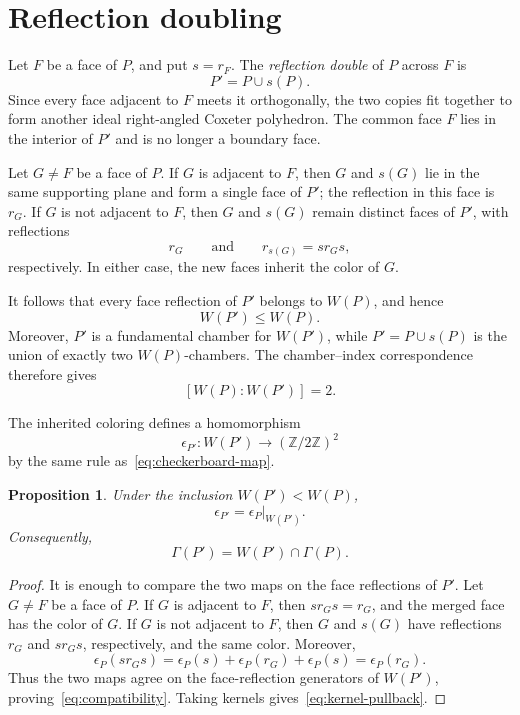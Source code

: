 \documentclass[11pt,a4paper]{amsart}
\newcommand{\ZZ}{\mathbb Z}
\theoremstyle{plain}
\newtheorem{proposition}[theorem]{Proposition}
\theoremstyle{remark}
\begin{document}
\section{Reflection doubling}\label{sec:doubling}
Let \(F\) be a face of \(P\), and put \(s=r_F\).  The
\emph{reflection double} of \(P\) across \(F\) is
\begin{equation}\label{eq:reflection-double}
  P'=P\cup s(P).
\end{equation}
Since every face adjacent to \(F\) meets it orthogonally, the two
copies fit together to form another ideal right-angled Coxeter
polyhedron.  The common face \(F\) lies in the interior of \(P'\)
and is no longer a boundary face.

Let \(G\neq F\) be a face of \(P\).  If \(G\) is adjacent to \(F\),
then \(G\) and \(s(G)\) lie in the same supporting plane and form
a single face of \(P'\); the reflection in this face is \(r_G\).
If \(G\) is not adjacent to \(F\), then \(G\) and \(s(G)\) remain
distinct faces of \(P'\), with reflections
\[
  r_G
  \qquad\text{and}\qquad
  r_{s(G)}=s r_G s,
\]
respectively.  In either case, the new faces inherit the color of
\(G\).

It follows that every face reflection of \(P'\) belongs to
\(W(P)\), and hence
\[
  W(P')\leq W(P).
\]
Moreover, \(P'\) is a fundamental chamber for \(W(P')\), while
\(P'=P\cup s(P)\) is the union of exactly two \(W(P)\)-chambers.
The chamber--index correspondence therefore gives
\begin{equation}\label{eq:W-index-two}
  [W(P):W(P')]=2.
\end{equation}

The inherited coloring defines a homomorphism
\[
  \epsilon_{P'}:W(P')\longrightarrow(\ZZ/2\ZZ)^2
\]
by the same rule as~\eqref{eq:checkerboard-map}.

\begin{proposition}\label{prop:compatibility}
Under the inclusion $W(P')<W(P)$,
\begin{equation}\label{eq:compatibility}
  \epsilon_{P'}=\left.\epsilon_P\right|_{W(P')}.
\end{equation}
Consequently,
\begin{equation}\label{eq:kernel-pullback}
  \Gamma(P')=W(P')\cap\Gamma(P).
\end{equation}
\end{proposition}

\begin{proof}
It is enough to compare the two maps on the face reflections of $P'$.  Let $G\neq F$ be a face of $P$.  If $G$ is adjacent to $F$, then $sr_Gs=r_G$, and the merged face has the color of $G$.  If $G$ is not adjacent to $F$, then $G$ and $s(G)$ have reflections $r_G$ and $sr_Gs$, respectively, and the same color.  Moreover,
\[
  \epsilon_P(sr_Gs)
  =\epsilon_P(s)+\epsilon_P(r_G)+\epsilon_P(s)
  =\epsilon_P(r_G).
\]
Thus the two maps agree on the face-reflection generators of $W(P')$, proving~\eqref{eq:compatibility}.  Taking kernels gives~\eqref{eq:kernel-pullback}.
\end{proof}
\end{document}

